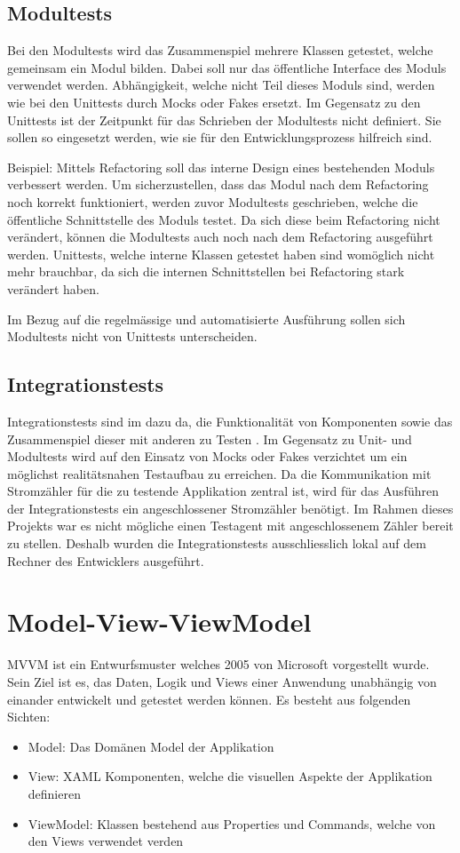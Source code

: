 \subsection{Modultests}
Bei den Modultests wird das Zusammenspiel mehrere Klassen getestet, welche gemeinsam ein Modul bilden.
Dabei soll nur das öffentliche Interface des Moduls verwendet werden.
Abhängigkeit, welche nicht Teil dieses Moduls sind, werden wie bei den Unittests durch Mocks oder Fakes ersetzt.
Im Gegensatz zu den Unittests ist der Zeitpunkt für das Schrieben der Modultests nicht definiert.
Sie sollen so eingesetzt werden, wie sie für den Entwicklungsprozess hilfreich sind.

Beispiel: Mittels Refactoring soll das interne Design eines bestehenden Moduls verbessert werden.
Um sicherzustellen, dass das Modul nach dem Refactoring noch korrekt funktioniert, werden zuvor Modultests geschrieben, welche die öffentliche Schnittstelle des Moduls testet.
Da sich diese beim Refactoring nicht verändert, können die Modultests auch noch nach dem Refactoring ausgeführt werden.
Unittests, welche interne Klassen getestet haben sind womöglich nicht mehr brauchbar, da sich die internen Schnittstellen bei Refactoring stark verändert haben.

Im Bezug auf die regelmässige und automatisierte Ausführung sollen sich Modultests nicht von Unittests unterscheiden.


\subsection{Integrationstests}\label{Integrationstests}
Integrationstests sind im dazu da, die Funktionalität von Komponenten sowie das Zusammenspiel dieser mit anderen zu Testen \parencite{winter2012integrationstest}.
Im Gegensatz zu Unit- und Modultests wird auf den Einsatz von Mocks oder Fakes verzichtet um ein möglichst realitätsnahen Testaufbau zu erreichen.
Da die Kommunikation mit Stromzähler für die zu testende Applikation zentral ist, wird für das Ausführen der Integrationstests ein angeschlossener Stromzähler benötigt.
Im Rahmen dieses Projekts war es nicht mögliche einen Testagent mit angeschlossenem Zähler bereit zu stellen.
Deshalb wurden die Integrationstests ausschliesslich lokal auf dem Rechner des Entwicklers ausgeführt.


\section{Model-View-ViewModel}\label{mvvm}
\ac{MVVM} ist ein Entwurfsmuster welches 2005 von Microsoft vorgestellt wurde.
Sein Ziel ist es, das Daten, Logik und Views einer Anwendung unabhängig von einander entwickelt und getestet werden können.
Es besteht aus folgenden Sichten:
\begin{itemize}
   \item Model: Das Domänen Model der Applikation
   \item View: XAML Komponenten, welche die visuellen Aspekte der Applikation definieren
   \item ViewModel: Klassen bestehend aus Properties und Commands, welche von den Views verwendet verden
\end{itemize}

